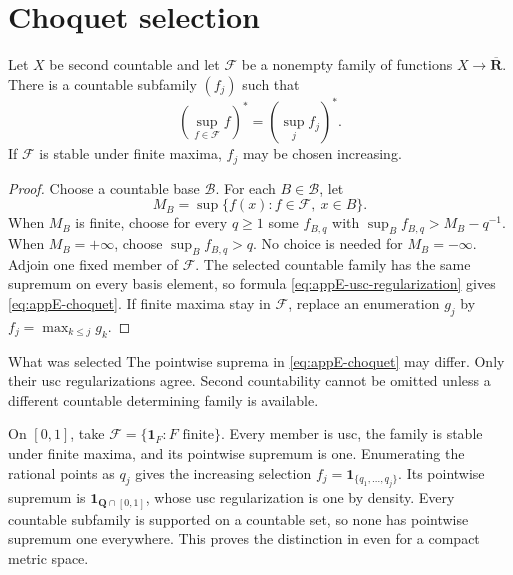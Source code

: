 \section{Choquet selection}
\label{sec:appE-choquet}

\begin{theorem}\label{thm:appE-choquet}
Let \(X\) be second countable and let \(\mathcal F\) be a nonempty family of
functions \(X\to\overline{\mathbf R}\).
There is a countable subfamily \((f_j)\) such that
\[
 \left(\sup_{f\in\mathcal F}f\right)^*
 =
 \left(\sup_jf_j\right)^*.
\tag{E.8}\label{eq:appE-choquet}
\]
If \(\mathcal F\) is stable under finite maxima, \(f_j\) may be chosen
increasing.
\end{theorem}

\begin{proof}
Choose a countable base \(\mathcal B\).
For each \(B\in\mathcal B\), let
\[
 M_B=\sup\{f(x):f\in\mathcal F,\ x\in B\}.
\]
When \(M_B\) is finite, choose for every \(q\geq1\) some \(f_{B,q}\) with
\(\sup_Bf_{B,q}>M_B-q^{-1}\).
When \(M_B=+\infty\), choose \(\sup_Bf_{B,q}>q\).
No choice is needed for \(M_B=-\infty\).
Adjoin one fixed member of \(\mathcal F\).
The selected countable family has the same supremum on every basis element,
so formula \eqref{eq:appE-usc-regularization} gives
\eqref{eq:appE-choquet}.
If finite maxima stay in \(\mathcal F\), replace an enumeration \(g_j\) by
\(f_j=\max_{k\leq j}g_k\).
\end{proof}

\begin{warning}{What was selected}
\label{warn:appE-choquet-scope}
The pointwise suprema in \eqref{eq:appE-choquet} may differ.
Only their usc regularizations agree.
Second countability cannot be omitted unless a different countable
determining family is available.
\end{warning}

\begin{example}
\label{ex:appE-choquet-spikes}
On \([0,1]\), take \(\mathcal F=\{\mathbf1_F:F\text{ finite}\}\).
Every member is usc, the family is stable under finite maxima, and its
pointwise supremum is one.  Enumerating the rational points as \(q_j\)
gives the increasing selection
\(f_j=\mathbf1_{\{q_1,\ldots,q_j\}}\).  Its pointwise supremum is
\(\mathbf1_{\mathbf Q\cap[0,1]}\), whose usc regularization is one by
density.  Every countable subfamily is supported on a countable set, so
none has pointwise supremum one everywhere.  This proves the distinction
in  even for a compact metric space.
\end{example}


